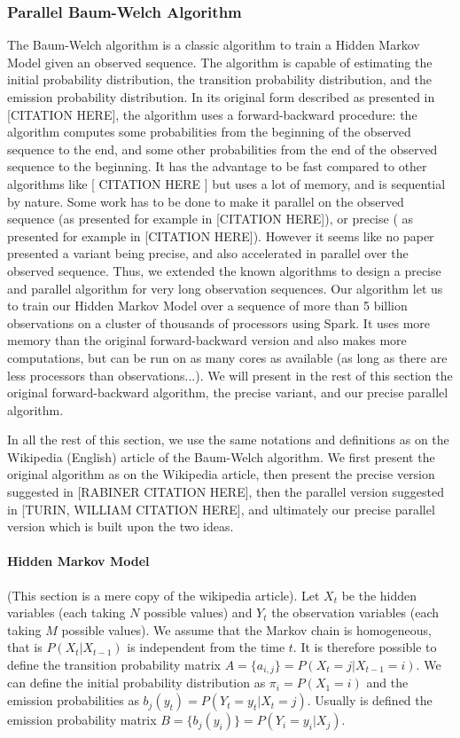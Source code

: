 \subsubsection{Parallel Baum-Welch Algorithm}
The Baum-Welch algorithm is a classic algorithm to train a Hidden Markov Model given an observed sequence. The algorithm is capable of estimating the initial probability distribution, the transition probability distribution, and the emission probability distribution.
In its original form described as presented in [CITATION HERE], the algorithm uses a forward-backward procedure: the algorithm computes some probabilities from the beginning of the observed sequence to the end, and some other probabilities from the end of the observed sequence to the beginning. It has the advantage to be fast compared to other algorithms like [ CITATION HERE ] but uses a lot of memory, and is sequential by nature.
Some work has to be done to make it parallel on the observed sequence (as presented for example in [CITATION HERE]), or precise ( as presented for example in [CITATION HERE]). However it seems like no paper presented a variant being precise, and also accelerated in parallel over the observed sequence.
Thus, we extended the known algorithms to design a precise and parallel algorithm for very long observation sequences.
Our algorithm let us to train our Hidden Markov Model over a sequence of more than 5 billion observations on a cluster of thousands of processors using Spark. It uses more memory than the original forward-backward version and also makes more computations, but can be run on as many cores as available (as long as there are less processors than observations...).
We will present in the rest of this section the original forward-backward algorithm, the precise variant, and our precise parallel algorithm.

In all the rest of this section, we use the same notations and definitions as on the Wikipedia (English) article of the Baum-Welch algorithm. We first present the original algorithm as on the Wikipedia article, then present the precise version suggested in [RABINER CITATION HERE], then the parallel version suggested in [TURIN, WILLIAM CITATION HERE], and ultimately our precise parallel version which is built upon the two ideas.

\paragraph{Hidden Markov Model}
(This section is a mere copy of the wikipedia article).
Let $X_t$ be the hidden variables (each taking $N$ possible values) and $Y_t$ the observation variables (each taking $M$ possible values). We assume that the Markov chain is homogeneous, that is $P(X_t|X_{t-1})$ is independent from the time $t$.
It is therefore possible to define the transition probability matrix $A = \{a_{i,j}\} = P(X_t = j | X_{t-1} = i)$.
We can define the initial probability distribution as $\pi_i = P(X_1=i)$ and the emission probabilities as $b_j(y_t) = P(Y_t = y_t | X_t = j)$. Usually is defined the emission probability matrix $B = \{b_j(y_i)\} = P(Y_i=y_i | X_j)$.

